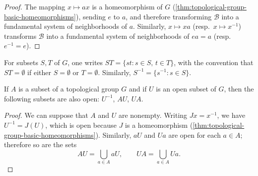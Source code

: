 \begin{proof}
    The mapping \( x \mapsto ax \) is a homeomorphism of \( G \) (\ref{thm:topological-group-basic-homeomorphisms}), sending \( e \) to \( a \),
    and therefore transforming \( \mathcal{B} \) into a fundamental system of neighborhoods of \( a \).
    Similarly, \( x \mapsto xa \) (resp.\ \( x \mapsto x^{-1} \)) transforms \( \mathcal{B} \) into a fundamental system of neighborhoods of \( ea = a \) (resp.\ \( e^{-1} = e \)).
\end{proof}

For subsets \( S, T \) of \( G \), one writes
\( ST = \{ st : s \in S,\, t \in T \} \),
with the convention that \( ST = \emptyset \) if either \( S = \emptyset \) or \( T = \emptyset \).
Similarly, \( S^{-1} = \{ s^{-1} : s \in S \}.\)

\begin{corollary}
    \label{cor:open-sets-inverse-translations}

    If \( A \) is a subset of a topological group \( G \) and if \( U \) is an open subset of \( G \),
    then the following subsets are also open: \( U^{-1} \), \( AU \), \( UA \).
\end{corollary}

\begin{proof}


    We can suppose that \( A \) and \( U \) are nonempty.
    Writing \( Jx = x^{-1} \), we have \( U^{-1} = J(U) \), which is open because \( J \) is a homeomorphism (\ref{thm:topological-group-basic-homeomorphisms}).
    Similarly, \( aU \) and \( Ua \) are open for each \( a \in A \); therefore so are the sets
    \[
        AU = \bigcup_{a \in A} aU,
        \qquad
        UA = \bigcup_{a \in A} Ua.
    \]
\end{proof}


